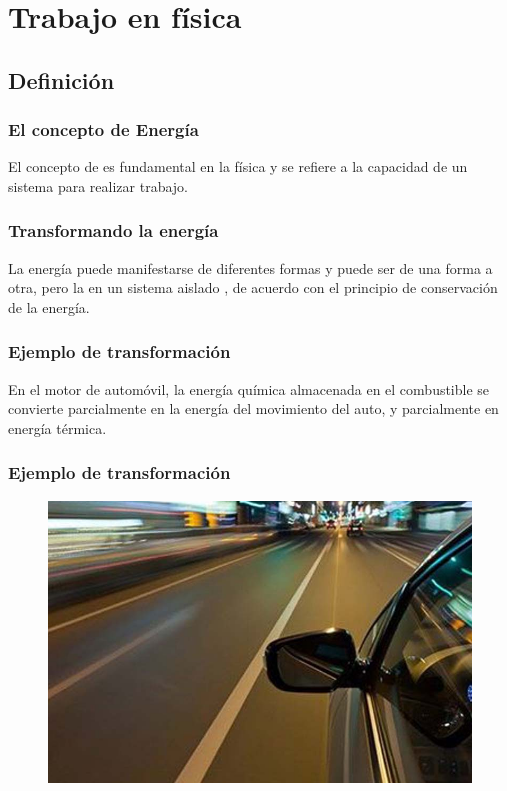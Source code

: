 \documentclass[14pt]{beamer}
\begin{document}
\section{Trabajo en física}
\subsection{Definición}

\begin{frame}
\frametitle{El concepto de Energía}
El concepto de  es fundamental en la física y se refiere a la capacidad de un sistema para realizar trabajo.
\end{frame}
\begin{frame}
\frametitle{Transformando la energía}
La energía puede manifestarse de diferentes formas y puede ser  de una forma a otra, \pause pero la  en un sistema aislado , de acuerdo con el principio de conservación de la energía.
\end{frame}
\begin{frame}
\frametitle{Ejemplo de transformación}
En el motor de automóvil, la energía química almacenada en el combustible se convierte parcialmente en la energía del movimiento del auto, y parcialmente en energía térmica.
\end{frame}
\begin{frame}
\frametitle{Ejemplo de transformación}    
\begin{figure}
    \centering
    \includegraphics[scale=0.3]{Imagenes/Energia_01.jpg}
\end{figure}
\end{frame}
\end{document}
